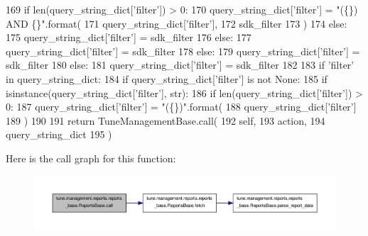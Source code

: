 \begin{DoxyCode}
169                         \textcolor{keywordflow}{if} len(query\_string\_dict[\textcolor{stringliteral}{'filter'}]) > 0:
170                             query\_string\_dict[\textcolor{stringliteral}{'filter'}] = \textcolor{stringliteral}{"(\{\}) AND \{\}"}.format(
171                                 query\_string\_dict[\textcolor{stringliteral}{'filter'}],
172                                 sdk\_filter
173                                 )
174                         \textcolor{keywordflow}{else}:
175                             query\_string\_dict[\textcolor{stringliteral}{'filter'}] = sdk\_filter
176                     \textcolor{keywordflow}{else}:
177                         query\_string\_dict[\textcolor{stringliteral}{'filter'}] = sdk\_filter
178                 \textcolor{keywordflow}{else}:
179                     query\_string\_dict[\textcolor{stringliteral}{'filter'}] = sdk\_filter
180             \textcolor{keywordflow}{else}:
181                 query\_string\_dict[\textcolor{stringliteral}{'filter'}] = sdk\_filter
182 
183         \textcolor{keywordflow}{if} \textcolor{stringliteral}{'filter'} \textcolor{keywordflow}{in} query\_string\_dict:
184             \textcolor{keywordflow}{if} query\_string\_dict[\textcolor{stringliteral}{'filter'}] \textcolor{keywordflow}{is} \textcolor{keywordflow}{not} \textcolor{keywordtype}{None}:
185                 \textcolor{keywordflow}{if} isinstance(query\_string\_dict[\textcolor{stringliteral}{'filter'}], str):
186                     \textcolor{keywordflow}{if} len(query\_string\_dict[\textcolor{stringliteral}{'filter'}]) > 0:
187                         query\_string\_dict[\textcolor{stringliteral}{'filter'}] = \textcolor{stringliteral}{"(\{\})"}.format(
188                             query\_string\_dict[\textcolor{stringliteral}{'filter'}]
189                         )
190 
191         \textcolor{keywordflow}{return} TuneManagementBase.call(
192             self,
193             action,
194             query\_string\_dict
195         )

\end{DoxyCode}


Here is the call graph for this function\-:
\nopagebreak
\begin{figure}[H]
\begin{center}
\leavevmode
\includegraphics[width=350pt]{classtune_1_1management_1_1reports_1_1reports__base_1_1ReportsBase_a1fb536c3921bc036376ad46ba5415b77_cgraph}
\end{center}
\end{figure}


